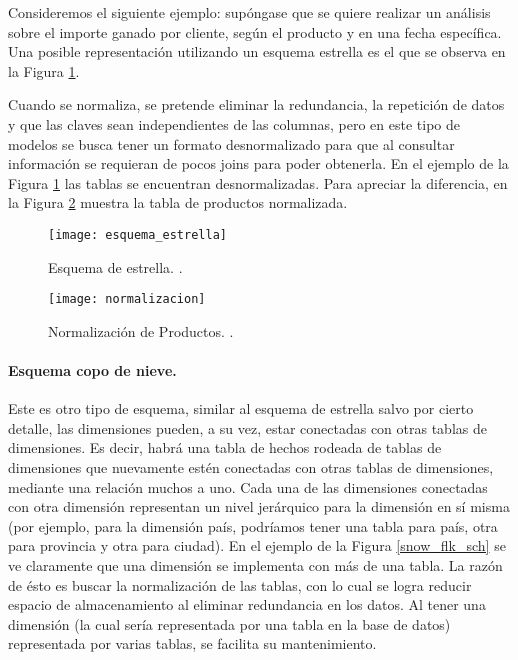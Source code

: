 \documentclass[a4paper,11pt]{article}
\begin{document}
    Consideremos el siguiente ejemplo: supóngase que se quiere realizar un análisis sobre el importe ganado por cliente, según el producto y en una fecha
    específica. Una posible representación utilizando un esquema estrella es el que se observa en la Figura \ref{star_sch}.
    
    Cuando se normaliza, se pretende eliminar la redundancia, la repetición de datos y que las claves sean independientes de
    las columnas, pero en este tipo de modelos se busca tener un formato desnormalizado para que al consultar información se requieran de pocos joins para
    poder obtenerla. En el ejemplo de la Figura \ref{star_sch} las tablas se encuentran desnormalizadas. Para apreciar la
    diferencia, en la Figura \ref{normalizado} muestra la tabla de productos normalizada.
    
    \begin{figure}
      \begin{center}
        \texttt{[image: esquema\_estrella]}
        \caption{Esquema de estrella. \cite[p.~38]{hefestov2}.}
        \label{star_sch}
      \end{center}
    \end{figure}
    
    \begin{figure}
      \begin{center}
        \texttt{[image: normalizacion]}
        \caption{Normalización de Productos. \cite[p.~38]{hefestov2}.}
        \label{normalizado}
      \end{center}
    \end{figure}
    
    
    \paragraph{Esquema copo de nieve.}
    
    Este es otro tipo de esquema, similar al esquema de estrella salvo por cierto detalle, las dimensiones pueden, a su vez, estar conectadas con otras 
    tablas de dimensiones. Es decir, habrá una tabla de hechos rodeada de tablas de dimensiones que nuevamente estén conectadas con otras tablas de 
    dimensiones, mediante una relación muchos a uno. Cada una de las dimensiones conectadas con otra dimensión representan un nivel jerárquico para la dimensión en 
    sí misma (por ejemplo, para la dimensión país, podríamos tener una tabla para país, otra para provincia y otra para ciudad). En el ejemplo de la Figura 
    \ref{snow_flk_sch} se ve claramente que una dimensión se implementa con más de una tabla. La razón de ésto es buscar la normalización de las tablas, con 
    lo cual se logra reducir espacio de almacenamiento al eliminar redundancia en los datos. Al tener una dimensión (la cual sería representada por una tabla 
    en la base de datos) representada por varias tablas, se facilita su mantenimiento.
    
\end{document}
